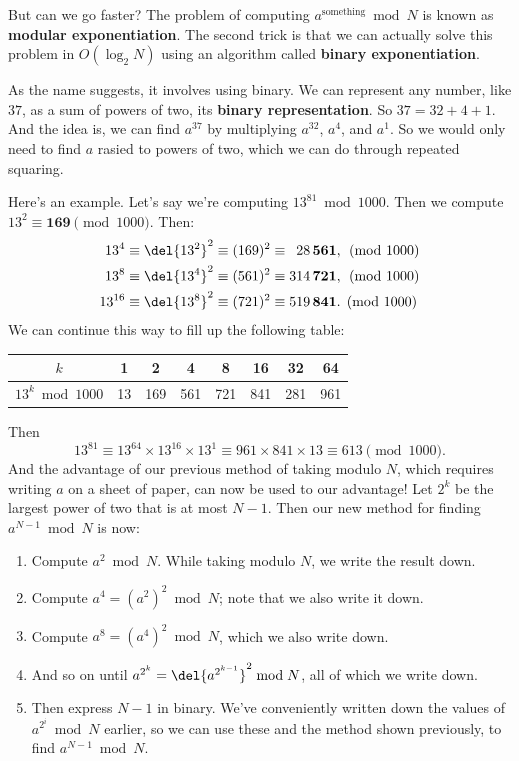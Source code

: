 \documentclass[11pt,paper=letter]{scrartcl}
\begin{document}
But can we go faster? The problem of computing $a^{\text{something}} \bmod N$ is known as \textbf{modular exponentiation}. The second trick is that we can actually solve this problem in $O(\log_2 N)$ using an algorithm called \textbf{binary exponentiation}.

As the name suggests, it involves using binary. We can represent any number, like $37$, as a sum of powers of two, its \textbf{binary representation}. So $37 = 32 + 4 + 1$. And the idea is, we can find $a^{37}$ by multiplying $a^{32}$, $a^{4}$, and $a^1$. So we would only need to find $a$ rasied to powers of two, which we can do through repeated squaring.

Here's an example. Let's say we're computing $13^{81} \bmod 1000$. Then we compute $13^2 \equiv \mathbf{169} \pmod{1000}$. Then:
\begin{align*}
  13^4 \equiv \del{13^2}^2 \equiv (169)^2 &\equiv \phantom{0}28\,\mathbf{561}, \pmod{1000} \\
  13^8 \equiv \del{13^4}^2 \equiv (561)^2 &\equiv 314\,\mathbf{721}, \pmod{1000} \\
  13^{16} \equiv \del{13^8}^2 \equiv (721)^2 &\equiv 519\,\mathbf{841}. \pmod{1000}
\end{align*}
We can continue this way to fill up the following table:
\begin{center}
  \begin{tabular}{c|ccccccc}
  $k$ & 1 & 2 & 4 & 8 & 16 & 32 & 64 \\ \hline
  $13^k \bmod 1000$ & 13 & 169 & 561 & 721 & 841 & 281 & 961
  \end{tabular}
\end{center}
Then
$$13^{81} \equiv 13^{64} \times 13^{16} \times 13^1 \equiv 961 \times 841 \times 13 \equiv 613 \pmod{1000}.$$
And the advantage of our previous method of taking modulo $N$, which requires writing $a$ on a sheet of paper, can now be used to our advantage! Let $2^k$ be the largest power of two that is at most $N-1$. Then our new method for finding $a^{N-1} \bmod N$ is now:
\begin{enumerate}
  \item Compute $a^2 \bmod N$. While taking modulo $N$, we write the result down.
  \item Compute $a^4 = (a^2)^2 \bmod N$; note that we also write it down.
  \item Compute $a^8 = (a^4)^2 \bmod N$, which we also write down.
  \item And so on until $a^{2^k} = \del{a^{2^{k-1}}}^2 \bmod N$, all of which we write down.
  \item Then express $N-1$ in binary. We've conveniently written down the values of $a^{2^i} \bmod N$ earlier, so we can use these and the method shown previously, to find $a^{N-1} \bmod N$.
\end{enumerate}
\end{document}
